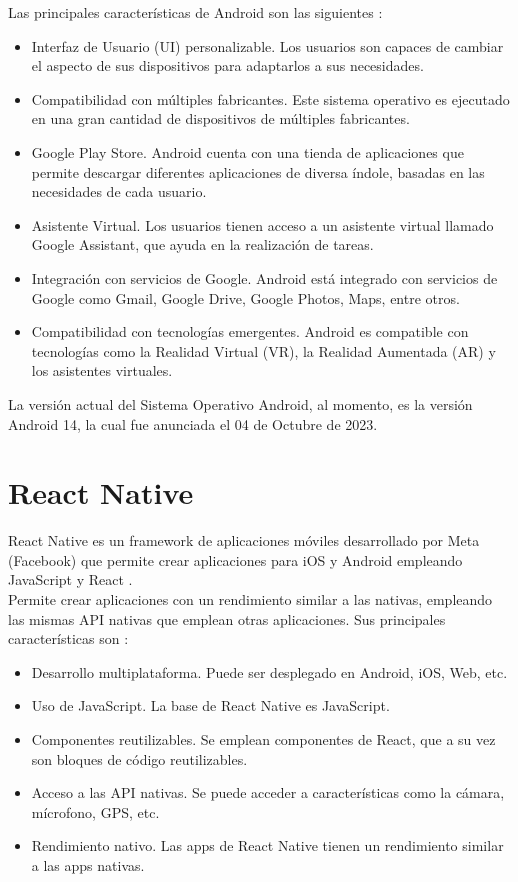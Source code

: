 Las principales características de Android son las siguientes \cite{ref57}:

\begin{itemize}

    \item Interfaz de Usuario (UI) personalizable. Los usuarios son capaces de cambiar el aspecto de sus dispositivos para adaptarlos a sus necesidades.
    \item Compatibilidad con múltiples fabricantes. Este sistema operativo es ejecutado en una gran cantidad de dispositivos de múltiples fabricantes.
    \item Google Play Store. Android cuenta con una tienda de aplicaciones que permite descargar diferentes aplicaciones de diversa índole, basadas en las necesidades de cada usuario.
    \item Asistente Virtual. Los usuarios tienen acceso a un asistente virtual llamado Google Assistant, que ayuda en la realización de tareas.
    \item Integración con servicios de Google. Android está integrado con servicios de Google como Gmail, Google Drive, Google Photos, Maps, entre otros.
    \item Compatibilidad con tecnologías emergentes. Android es compatible con tecnologías como la Realidad Virtual (VR), la Realidad Aumentada (AR) y los asistentes virtuales. 
\end{itemize}

La versión actual del Sistema Operativo Android, al momento, es la versión Android 14, la cual fue anunciada el 04 de Octubre de 2023.

\newpage
\section{React Native}
React Native es un framework de aplicaciones móviles desarrollado por Meta (Facebook) que permite crear aplicaciones para iOS y Android empleando JavaScript y React \cite{ref59}.\\

Permite crear aplicaciones con un rendimiento similar a las nativas, empleando las mismas API nativas que emplean otras aplicaciones. Sus principales características son \cite{ref59}:

\begin{itemize}
    \item Desarrollo multiplataforma. Puede ser desplegado en Android, iOS, Web, etc.
    \item Uso de JavaScript. La base de React Native es JavaScript.
    \item Componentes reutilizables. Se emplean componentes de React, que a su vez son bloques de código reutilizables.
    \item Acceso a las API nativas. Se puede acceder a características como la cámara, mícrofono, GPS, etc.
    \item Rendimiento nativo. Las apps de React Native tienen un rendimiento similar a las apps nativas.
\end{itemize}


